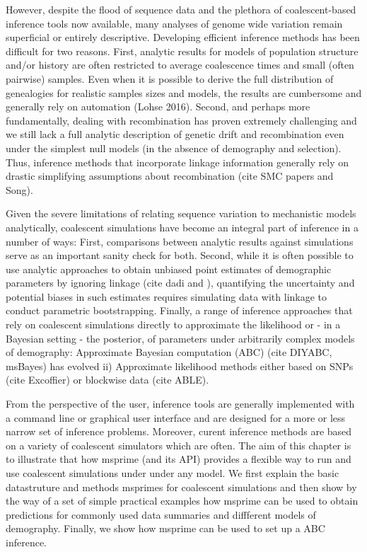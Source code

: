 \documentclass[graybox]{svmult}
\begin{document}
However, despite the flood of sequence data and the plethora of
coalescent-based inference tools now available, many analyses of genome
wide variation remain superficial or entirely descriptive. Developing
efficient inference methods has been difficult for two reasons. First,
analytic results for models of population structure and/or history are
often restricted to average coalescence times and small (often pairwise)
samples. Even when it is possible to derive the full distribution of
genealogies for realistic samples sizes and models, the results are
cumbersome and generally rely on automation (Lohse 2016). Second, and
perhaps more fundamentally, dealing with recombination has proven
extremely challenging and we still lack a full analytic description of
genetic drift and recombination even under the simplest null models (in
the absence of demography and selection). Thus, inference methods that
incorporate linkage information generally rely on drastic simplifying
assumptions about recombination (cite SMC papers and Song).

Given the severe limitations of relating sequence variation to
mechanistic models analytically, coalescent simulations have become an
integral part of inference in a number of ways: First, comparisons
between analytic results against simulations serve as an important
sanity check for both. Second, while it is often possible to use
analytic approaches to obtain unbiased point estimates of demographic
parameters by ignoring linkage (cite dadi and ), quantifying the
uncertainty and potential biases in such estimates requires simulating
data with linkage to conduct parametric bootstrapping. Finally, a range
of inference approaches that rely on coalescent simulations directly to
approximate the likelihood or - in a Bayesian setting - the posterior,
of parameters under arbitrarily complex models of demography:
Approximate Bayesian computation (ABC) (cite DIYABC, msBayes) has
evolved ii) Approximate likelihood methods either based on SNPs (cite
Excoffier) or blockwise data (cite ABLE).

From the perspective of the user, inference tools are generally
implemented with a command line or graphical user interface and are
designed for a more or less narrow set of inference problems. Moreover,
curent inference methods are based on a variety of coalescent simulators
which are often. The aim of this chapter is to illustrate that how
msprime (and its API) provides a flexible way to run and use coalescent
simulations under under any model. We first explain the basic
datastruture and methods msprimes for coalescent simulations and then
show by the way of a set of simple practical examples how msprime can be
used to obtain predictions for commonly used data summaries and
diffferent models of demography. Finally, we show how msprime can be
used to set up a ABC inference.
\end{document}
